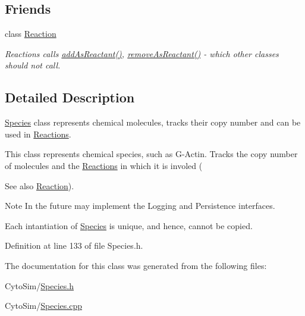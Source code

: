 \subsection*{Friends}
\begin{DoxyCompactItemize}
\item 
class \hyperlink{group__Chemistry_ga5f86463029cca47f8aa15ff8cd5b9e51}{Reaction}
\begin{DoxyCompactList}\small\item\em Reactions calls \hyperlink{group__Chemistry_ga6fee690741da9669da13f21c300a0874}{add\-As\-Reactant()}, \hyperlink{group__Chemistry_ga9878701daf45bb766200527375a0f6f4}{remove\-As\-Reactant()} -\/ which other classes should not call. \end{DoxyCompactList}\end{DoxyCompactItemize}


\subsection{Detailed Description}
\hyperlink{classSpecies}{Species} class represents chemical molecules, tracks their copy number and can be used in \hyperlink{classReaction}{Reactions}. 

This class represents chemical species, such as G-\/\-Actin. Tracks the copy number of molecules and the \hyperlink{classReaction}{Reactions} in which it is involed (\begin{DoxySeeAlso}{See also}
\hyperlink{classReaction}{Reaction}). 
\end{DoxySeeAlso}
\begin{DoxyNote}{Note}
In the future may implement the Logging and Persistence interfaces. 

Each intantiation of \hyperlink{classSpecies}{Species} is unique, and hence, cannot be copied. 
\end{DoxyNote}


Definition at line 133 of file Species.\-h.



The documentation for this class was generated from the following files\-:\begin{DoxyCompactItemize}
\item 
Cyto\-Sim/\hyperlink{Species_8h}{Species.\-h}\item 
Cyto\-Sim/\hyperlink{Species_8cpp}{Species.\-cpp}\end{DoxyCompactItemize}
